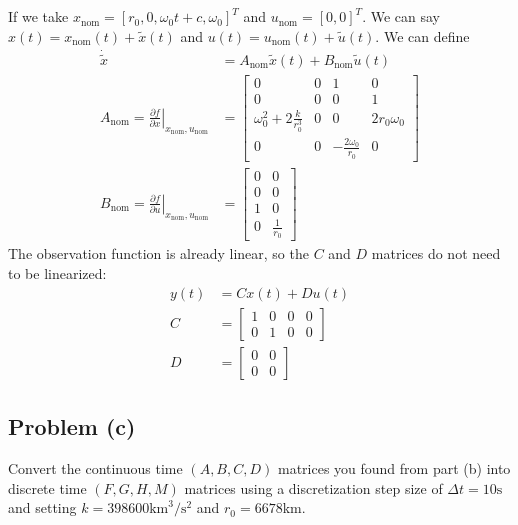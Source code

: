 \documentclass[11pt]{article}
\begin{document}
\subparagraph*{}
If we take $x_\text{nom} = [r_0,0,\omega_0t+c,\omega_0]^T$ and $u_\text{nom} = [0,0]^T$. We can say $x(t)=x_\text{nom}(t)+\tilde{x}(t)$ and $u(t) = u_\text{nom}(t) + \tilde{u}(t)$. We can define 
\begin{align*}
	\dot{\tilde{x}} &= A_\text{nom} \tilde{x}(t) + B_\text{nom}\tilde{u}(t) \\
	A_\text{nom} = \left. \frac{\partial f}{\partial x} \right|_{x_\text{nom},u_\text{nom}} &= \begin{bmatrix} 0 & 0 & 1 & 0 \\
	0 & 0 & 0 & 1 \\ \omega_0^2+2\frac{k}{r_0^3} & 0 & 0 & 2r_0\omega_0 \\ 0 & 0 & -\frac{2\omega_0}{r_0} & 0 \end{bmatrix} \\
	B_\text{nom} = \left. \frac{\partial f}{\partial u} \right|_{x_\text{nom},u_\text{nom}} & = \begin{bmatrix} 0 & 0 \\ 0 & 0 \\ 1 & 0 \\ 0 & \frac{1}{r_0} \end{bmatrix}
\end{align*}
The observation function is already linear, so the $C$ and $D$ matrices do not need to be linearized:
\begin{align*}
	y(t) &= Cx(t) + Du(t) \\
	C &= \begin{bmatrix} 1 & 0 & 0 & 0 \\ 0 & 1 & 0 & 0 \end{bmatrix} \\
	D &= \begin{bmatrix} 0 & 0 \\ 0 & 0 \end{bmatrix}
\end{align*}

\subsection*{Problem (c)}
Convert the continuous time $(A,B,C,D)$ matrices you found from part (b) into discrete time $(F,G,H,M)$ matrices using a discretization step size of $\Delta t=10\text{s}$ and setting $k=398600\text{km}^3/\text{s}^2$ and $r_0=6678$km.
\end{document}
